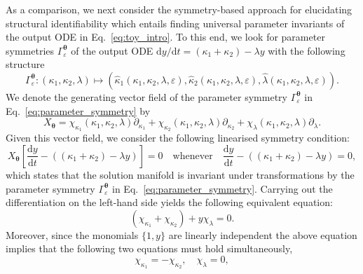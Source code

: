 \documentclass[12pt]{article}
\begin{document}
As a comparison, we next consider the symmetry-based approach for elucidating structural identifiability which entails finding universal parameter invariants of the output ODE in Eq.~\eqref{eq:toy_intro}. To this end, we look for parameter symmetries $\Gamma_{\varepsilon}^{\boldsymbol{\theta}}$ of the output ODE $\mathrm{d}y/\mathrm{d}t=(\kappa_{1}+\kappa_{2})-\lambda{y}$ with the following structure
\begin{equation}
    \Gamma_{\varepsilon}^{\boldsymbol{\theta}}:(\kappa_{1},\kappa_{2},\lambda)\mapsto(\hat{\kappa}_{1}(\kappa_{1},\kappa_{2},\lambda,\varepsilon),\hat{\kappa}_{2}(\kappa_{1},\kappa_{2},\lambda,\varepsilon),\hat{\lambda}(\kappa_{1},\kappa_{2},\lambda,\varepsilon)).
    \label{eq:parameter_symmetry}
\end{equation}
We denote the generating vector field of the parameter symmetry $\Gamma_{\varepsilon}^{\boldsymbol{\theta}}$ in Eq.~\eqref{eq:parameter_symmetry} by
\begin{equation}
    X_{\boldsymbol{\theta}}=\chi_{\kappa_{1}}(\kappa_{1},\kappa_{2},\lambda)\partial_{\kappa_{1}}+\chi_{\kappa_{2}}(\kappa_{1},\kappa_{2},\lambda)\partial_{\kappa_{2}}+\chi_{\lambda}(\kappa_{1},\kappa_{2},\lambda)\partial_{\lambda}.
    \label{eq:X_theta}
\end{equation}
Given this vector field, we consider the following linearised symmetry condition:
\begin{equation}
    X_{\boldsymbol{\theta}}\left[  \dfrac{\mathrm{d}y}{\mathrm{d}t}-((\kappa_{1}+\kappa_{2})-\lambda{y})\right]=0\quad\textrm{whenever}\quad  \dfrac{\mathrm{d}y}{\mathrm{d}t}-((\kappa_{1}+\kappa_{2})-\lambda{y})=0,
    \label{eq:lin_sym_toy_1}
\end{equation}
which states that the solution manifold is invariant under transformations by the parameter symmetry $\Gamma_{\varepsilon}^{\boldsymbol{\theta}}$ in Eq.~\eqref{eq:parameter_symmetry}. Carrying out the differentiation on the left-hand side yields the following equivalent equation:
\begin{equation}(\chi_{\kappa_{1}}+\chi_{\kappa_{2}})+y\chi_{\lambda}=0.
    \label{eq:lin_sym_toy_2}
\end{equation}
Moreover, since the monomials $\{1,y\}$ are linearly independent the above equation implies that the following two equations must hold simultaneously,
\begin{equation}
    \chi_{\kappa_{1}}=-\chi_{\kappa_{2}},\quad\chi_{\lambda}=0,
    \label{eq:lin_sym_toy_3}
\end{equation}
\end{document}
